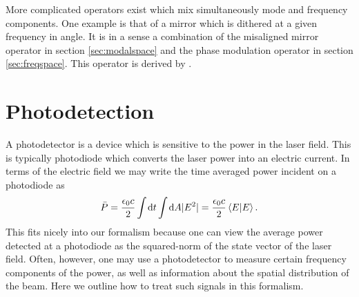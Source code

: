 More complicated operators exist which mix simultaneously mode and frequency components. %
One example is that of a mirror which is dithered at a given frequency in angle. %
It is in a sense a combination of the misaligned mirror operator in section \ref{sec:modalspace} and the phase modulation operator in section \ref{sec:freqspace}. %
This operator is derived by \citet{Sigg:00}.
\section{Photodetection}
A photodetector is a device which is sensitive to the power in the laser field. %
This is typically photodiode which converts the laser power into an electric current. %
In terms of the electric field we may write the time averaged power incident on a photodiode as
\begin{equation}
\bar{P}=\frac{\epsilon_0 c}{2}\int \! \! \dd t \int \! \! \dd A|E^2|=\frac{\epsilon_0 c}{2}\inprod{E}{E}.
\end{equation}
This fits nicely into our formalism because one can view the average power detected at a photodiode as the squared-norm of the state vector of the laser field. %
Often, however, one may use a photodetector to measure certain frequency components of the power, as well as information about the spatial distribution of the beam. %
Here we outline how to treat such signals in this formalism.

